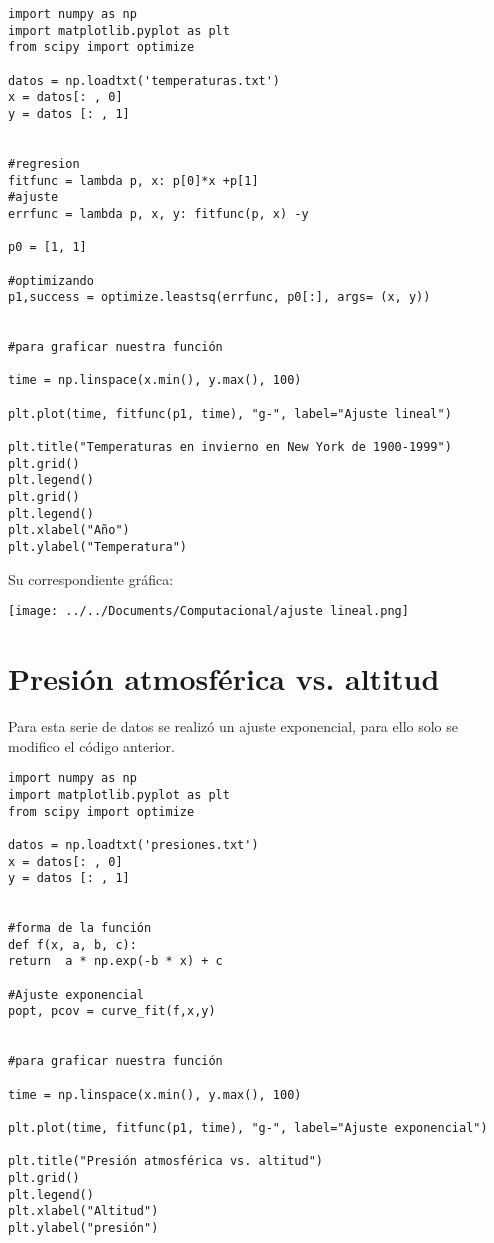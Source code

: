 \documentclass[12pt]{article}
\begin{document}
\begin{verbatim}
import numpy as np
import matplotlib.pyplot as plt
from scipy import optimize

datos = np.loadtxt('temperaturas.txt')
x = datos[: , 0]
y = datos [: , 1]


#regresion
fitfunc = lambda p, x: p[0]*x +p[1]
#ajuste
errfunc = lambda p, x, y: fitfunc(p, x) -y

p0 = [1, 1]

#optimizando
p1,success = optimize.leastsq(errfunc, p0[:], args= (x, y))


#para graficar nuestra función

time = np.linspace(x.min(), y.max(), 100)

plt.plot(time, fitfunc(p1, time), "g-", label="Ajuste lineal")

plt.title("Temperaturas en invierno en New York de 1900-1999")
plt.grid()
plt.legend()
plt.grid()
plt.legend()
plt.xlabel("Año")
plt.ylabel("Temperatura")

\end{verbatim}
Su correspondiente gráfica:


\texttt{[image: ../../Documents/Computacional/ajuste lineal.png]} 

\section*{Presión atmosférica vs. altitud}

Para esta serie de datos se realizó un ajuste exponencial, para ello solo se modifico el código anterior.

\begin{verbatim}
import numpy as np
import matplotlib.pyplot as plt
from scipy import optimize

datos = np.loadtxt('presiones.txt')
x = datos[: , 0]
y = datos [: , 1]


#forma de la función
def f(x, a, b, c):
return  a * np.exp(-b * x) + c

#Ajuste exponencial
popt, pcov = curve_fit(f,x,y)


#para graficar nuestra función

time = np.linspace(x.min(), y.max(), 100)

plt.plot(time, fitfunc(p1, time), "g-", label="Ajuste exponencial")

plt.title("Presión atmosférica vs. altitud")
plt.grid()
plt.legend()
plt.xlabel("Altitud")
plt.ylabel("presión")
\end{verbatim}
\end{document}
